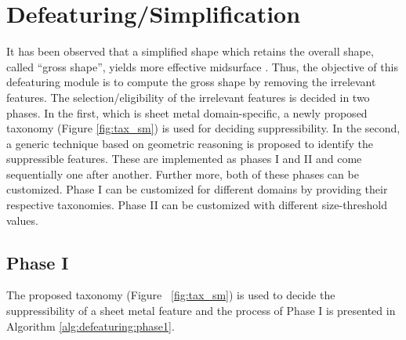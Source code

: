 
\section{Defeaturing/Simplification} \label{cagd:sec:defeaturing}
It has been observed that a simplified shape which retains the overall shape, called ``gross shape'', yields more effective midsurface \cite{YogeshCADConf2015}. Thus, the objective of this defeaturing module is to compute the gross shape by removing the irrelevant features. The selection/eligibility of the irrelevant features is decided in two phases. In the first, which is sheet metal domain-specific, a newly proposed taxonomy (Figure \ref{fig:tax_sm}) is used for deciding suppressibility. In the second, a generic technique based on geometric reasoning is proposed to identify the suppressible features. These are implemented as phases I and II and come sequentially one after another. Further more, both of these phases can be customized. Phase I can be customized for different domains by providing their respective taxonomies. Phase II can be customized with different size-threshold values.

\subsection{Phase I}\label{ph1}
The proposed  taxonomy (Figure ~\ref{fig:tax_sm}) is used to decide the suppressibility of a sheet metal feature and the process of Phase I is presented in Algorithm \ref{alg:defeaturing:phase1}.

